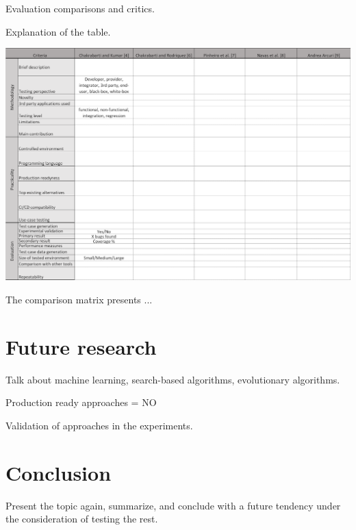 \documentclass[english]{tktltiki}
\begin{document}
Evaluation comparisons and critics.

Explanation of the table.

\begin{table}[h]
	\begin{center}
		\hspace*{-1.25cm}
		\includegraphics[width=1\textwidth]{images/comparison.png}
		\caption{The comparison matrix presents ...}
		\label{table:comparison}
	\end{center}
\end{table}

\section{Future research}
Talk about machine learning, search-based algorithms, evolutionary algorithms.

Production ready approaches = NO

Validation of approaches in the experiments. 

\section{Conclusion}
Present the topic again, summarize, and conclude with a future tendency under the consideration of testing the rest.

\newpage
\nocite{*}
%
%


%



\lastpage
\end{document}
